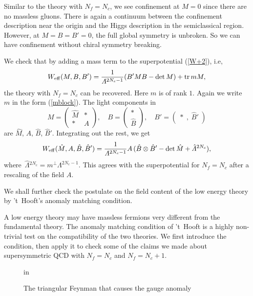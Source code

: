 \documentclass[lecture]{qft-l}
\newcommand{\Lam}{\varLambda}
\newcommand{\bef}{\begin{figure}[h]
		\vspace{3ex}}
\newcommand{\enf}{\end{figure}}
\newcommand{\inv}[1]{\frac{1}{#1}}
\newcommand{\tr}{{\rm tr}}
\newcommand{\eff}{_{{\rm eff}}}
\newcommand{\four}[4]{\left(	\begin{array}{cc}
				{#1}	&	{#2}	\\
				{#3}	&	{#4}
				\end{array}   \right)}
\newcommand{\BT}{B'}%
\newcommand{\Lamh}{\,\hat{\!\Lam}{}}
\numberwithin{figure}{chapter}
\begin{document}
Similar to the theory with $N_f=N_c$, we see confinement at $M=0$
since there are no massless gluons.
There is again a continuum between the confinement description near
the origin and the Higgs description in the semiclassical region.
However, at $M=B=\BT=0$, the full global symmetry is unbroken.
So we can have confinement without chiral symmetry breaking.

We check that by adding a mass term to the superpotential (\ref{W+2}), i.e,
	\begin{equation}
W\eff(M,B,\BT)=\inv{\Lam^{2N_c-1}}(\BT MB-\det M)+\tr\,mM,	
	\end{equation}
the theory with $N_f=N_c$ can be recovered.
Here $m$ is of rank $1$.
Again we write $m$ in the form (\ref{mblock}).
The light components in
	\begin{equation}
M=\four{\hat M}{*}{*}{A},\quad
B=\left(\begin{array}{c}    *	\\	\hat B	\end{array}\right),\quad
\BT=\left(\;*\;,\;\hat\BT\;\right)
	\end{equation}
are $\hat M$, $A$, $\hat B$, $\hat\BT$.
Integrating out the rest, we get
	\begin{equation}
W\eff(\hat M,A,\hat B,\hat\BT)=\inv{\Lam^{2N_c-1}}
A\,(\hat B\otimes\hat\BT-\det\hat M+\Lamh^{2N_c}),
	\end{equation}
where $\Lamh^{2N_c}=m^\perp\Lam^{2N_c-1}$.
This agrees with the superpotential for $N_f=N_c$ after a rescaling of 
the field $A$.

We shall further check the postulate on the field content of the low energy
theory by 't~Hooft's anomaly matching condition.


A low energy theory may have massless fermions very different 
from the fundamental theory. 
The anomaly matching condition of 't~Hooft is a highly non-trivial test
on the compatibility of the two theories.
We first introduce the condition, then apply it to check some of the claims
we made about supersymmetric QCD with $N_f=N_c$ and $N_f=N_c+1$.

	\bef
{} in
\centerline{}
\caption{\protect\label{TRIANG}The triangular Feynman that causes the gauge 
anomaly}
	\enf
\end{document}
